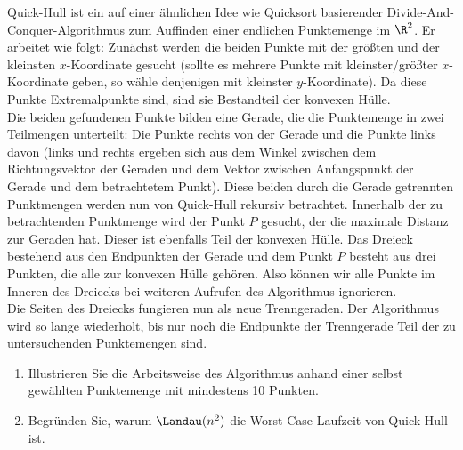 
\begin{exercise}

Quick-Hull ist ein auf einer ähnlichen Idee wie Quicksort basierender
Divide-And-Conquer-Algorithmus zum Auffinden einer endlichen Punktemenge im $\R^2$.
Er arbeitet wie folgt: Zunächst werden die beiden Punkte mit der größten und der
kleinsten $x$-Koordinate gesucht (sollte es mehrere Punkte mit kleinster/größter
$x$-Koordinate geben, so wähle denjenigen mit kleinster $y$-Koordinate).
Da diese Punkte Extremalpunkte sind, sind sie Bestandteil der konvexen Hülle. \\
Die beiden gefundenen Punkte bilden eine Gerade, die die Punktemenge in zwei
Teilmengen unterteilt: Die Punkte rechts von der Gerade und die Punkte links davon
(links und rechts ergeben sich aus dem Winkel zwischen dem Richtungsvektor der Geraden
und dem Vektor zwischen Anfangspunkt der Gerade und dem betrachtetem Punkt).
Diese beiden durch die Gerade getrennten Punktmengen werden nun von Quick-Hull
rekursiv betrachtet. Innerhalb der zu betrachtenden Punktmenge wird der Punkt $P$
gesucht, der die maximale Distanz zur Geraden hat. Dieser ist ebenfalls Teil der
konvexen Hülle. Das Dreieck bestehend aus den Endpunkten der Gerade und dem Punkt $P$
besteht aus drei Punkten, die alle zur konvexen Hülle gehören. Also können wir
alle Punkte im Inneren des Dreiecks bei weiteren Aufrufen des Algorithmus ignorieren. \\
Die Seiten des Dreiecks fungieren nun als neue Trenngeraden. Der Algorithmus
wird so lange wiederholt, bis nur noch die Endpunkte der Trenngerade Teil der
zu untersuchenden Punktemengen sind.

\begin{enumerate}[label = \alph*)]
  \item Illustrieren Sie die Arbeitsweise des Algorithmus anhand einer selbst
  gewählten Punktemenge mit mindestens 10 Punkten.
  \item Begründen Sie, warum $\Landau(n^2)$ die Worst-Case-Laufzeit von Quick-Hull ist.
\end{enumerate}

\end{exercise}



\begin{solution}

\phantom{}

\end{solution}
